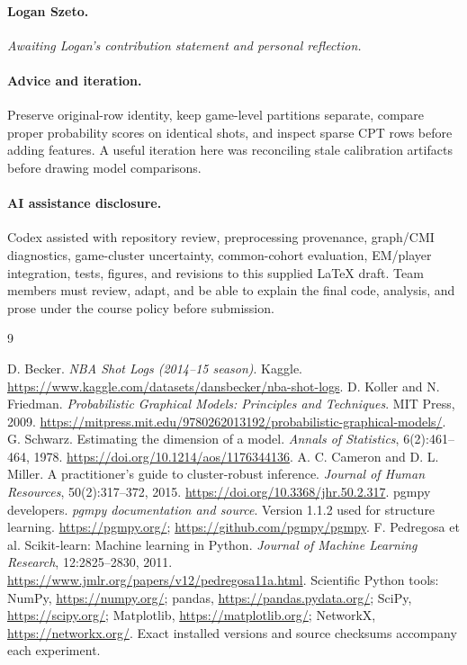 \documentclass{article}
\begin{document}
\paragraph{Logan Szeto.} \textit{Awaiting Logan's contribution statement and personal reflection.}
\paragraph{Advice and iteration.} Preserve original-row identity, keep game-level
partitions separate, compare proper probability scores on identical shots, and
inspect sparse CPT rows before adding features. A useful iteration here was
reconciling stale calibration artifacts before drawing model comparisons.
\paragraph{AI assistance disclosure.} Codex assisted with repository review,
preprocessing provenance, graph/CMI diagnostics, game-cluster uncertainty,
common-cohort evaluation, EM/player integration, tests, figures, and revisions to this supplied LaTeX
draft. Team members must review, adapt, and be able to explain the final code,
analysis, and prose under the course policy before submission.

\clearpage
\begin{thebibliography}{9}
\raggedright
{} D. Becker. \emph{NBA Shot Logs (2014--15 season)}. Kaggle.
\url{https://www.kaggle.com/datasets/dansbecker/nba-shot-logs}.
 D. Koller and N. Friedman. \emph{Probabilistic Graphical Models:
Principles and Techniques}. MIT Press, 2009.
\url{https://mitpress.mit.edu/9780262013192/probabilistic-graphical-models/}.
 G. Schwarz. Estimating the dimension of a model.
\emph{Annals of Statistics}, 6(2):461--464, 1978.
\url{https://doi.org/10.1214/aos/1176344136}.
 A. C. Cameron and D. L. Miller. A practitioner's guide to
cluster-robust inference. \emph{Journal of Human Resources}, 50(2):317--372, 2015.
\url{https://doi.org/10.3368/jhr.50.2.317}.
 pgmpy developers. \emph{pgmpy documentation and source}.
Version 1.1.2 used for structure learning.
\url{https://pgmpy.org/}; \url{https://github.com/pgmpy/pgmpy}.
 F. Pedregosa et al. Scikit-learn: Machine learning in Python.
\emph{Journal of Machine Learning Research}, 12:2825--2830, 2011.
\url{https://www.jmlr.org/papers/v12/pedregosa11a.html}.
 Scientific Python tools: NumPy, \url{https://numpy.org/};
pandas, \url{https://pandas.pydata.org/}; SciPy, \url{https://scipy.org/};
Matplotlib, \url{https://matplotlib.org/}; NetworkX, \url{https://networkx.org/}.
Exact installed versions and source checksums accompany each experiment.
\end{thebibliography}
\end{document}
